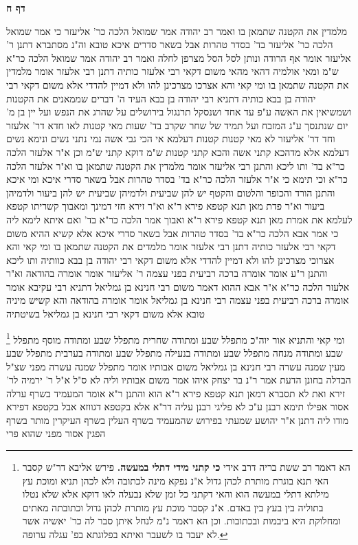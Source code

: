 \documentclass[12pt, openany]{book}
\newcommand{\sethebfont}{
\fontsize{10.5pt}{21.0pt} \selectfont
}
\newcommand{\twocol}[1]{
	{\sethebfont \begin{multicols}{2}
			#1
	\end{multicols}}	
}
\newcommand{\sectname}{}
\newcommand{\newsection}[1]{
	\addcontentsline{toc}{section}{#1}
	\renewcommand{\sectname}{#1}	
	\vspace{-\baselineskip}
	\begin{center}
		\textbf{%
\fontsize{16pt}{16pt}\selectfont
			#1}
	\end{center}
	\vspace{-\baselineskip}
	\nopagebreak
}
\newcommand{\footnotecomment}[1]{
	\renewcommand\thefootnote{}
	\footnote{#1}}
\newcommand{\commenta}[1]{\footnotecomment{#1}}
\begin{document}
\newsection{דף ח}
\twocol{מלמדין את הקטנה שתמאן בו ואמר רב יהודה אמר שמואל הלכה כר' אליעזר כי אמר שמואל הלכה כר' אליעזר בד' בסדר טהרות אבל בשאר סדרים איכא טובא 
וה"נ מסתברא דתנן ר' אליעזר אומר אף הרודה ונותן לסל הסל מצרפן לחלה ואמר רב יהודה אמר שמואל הלכה כר"א ש"מ 
ומאי אולמיה דהאי מהאי משום דקאי רבי אלעזר כותיה 
דתנן רבי אלעזר אומר מלמדין את הקטנה שתמאן בו 
ומי קאי והא אצרכו מצרכינן להו ולא דמיין להדדי אלא משום דקאי רבי יהודה בן בבא כותיה 
דתניא רבי יהודה בן בבא העיד ה' דברים שממאנים את הקטנות
ושמשיאין את האשה ע"פ עד אחד ושנסקל תרנגול בירושלים על שהרג את הנפש ועל יין בן מ' יום שנתנסך ע"ג המזבח ועל תמיד של שחר שקרב בד' שעות 
מאי קטנות לאו חדא דר' אלעזר וחד דר' אליעזר לא מאי קטנות קטנות דעלמא 
אי הכי גבי אשה נמי נתני נשים ונימא נשים דעלמא אלא מדהכא קתני אשה והכא קתני קטנות ש"מ דוקא קתני ש"מ 
וכן א"ר אלעזר הלכה כר"א בד' ותו ליכא והתנן רבי אליעזר אומר מלמדין את הקטנה שתמאן בו וא"ר אלעזר הלכה כר"א וכי תימא כי א"ר אלעזר הלכה כר"א בד' בסדר טהרות אבל בשאר סדרי איכא ומי איכא 
והתנן הורד והכופר והלטום והקטף יש להן שביעית ולדמיהן שביעית יש להן ביעור ולדמיהן ביעור וא"ר פדת מאן תנא קטפא פירא ר"א 
וא"ר זירא חזי דמינך ומאבוך קשריתו קטפא לעלמא את אמרת מאן תנא קטפא פירא ר"א ואבוך אמר הלכה כר"א בד' 
ואם איתא לימא ליה כי אמר אבא הלכה כר"א בד' בסדר טהרות אבל בשאר סדרי איכא 
אלא קשיא ההיא משום דקאי רבי אלעזר כותיה דתנן רבי אלעזר אומר מלמדים את הקטנה שתמאן בו 
ומי קאי והא אצרוכי מצרכינן להו ולא דמיין להדדי אלא משום דקאי רבי יהודה בן בבא כוותיה 
ותו ליכא והתנן ר"ע אומר אומרה ברכה רביעית בפני עצמה ר' אליעזר אומר אומרה בהודאה וא"ר אלעזר הלכה כר"א 
א"ר אבא ההוא דאמר משום רבי חנינא בן גמליאל דתניא רבי עקיבא אומר אומרה ברכה רביעית בפני עצמה רבי חנינא בן גמליאל אומר אומרה בהודאה
והא קשיש מיניה טובא אלא משום דקאי רבי חנינא בן גמליאל בשיטתיה 
\commenta{ הא דאמר רב ששת בריה דרב אידי \textbf{כי קתני מידי דתלי במעשה.} פירש אליבא דר"ש קסבר האי תנא בוגרת מותרת לכהן גדול א"נ נפקא מינה לכתובה ולא לכהן תניא ומוכת עץ מילתא דתלי במעשה הוא והאי דקתני כל זמן שלא נבעלה לאו דוקא אלא שלא נטלו בתוליה בין בעץ בין באדם. א"נ קסבר מוכת עץ מותרת לכהן גדול וכתובתה מאתים ומחלוקת היא ביבמות ובכתובות. וכן הא דאמר נ"מ לנחל איתן סבר לה כר' יאשיה אשר לא יעבד בו לשעבר ואיתא בפלוגתא בפ' עגלה ערופה. }
ומי קאי והתניא אור יוה"כ מתפלל שבע ומתודה שחרית מתפלל שבע ומתודה מוסף מתפלל שבע ומתודה מנחה מתפלל שבע ומתודה בנעילה מתפלל שבע ומתודה בערבית מתפלל שבע מעין שמנה עשרה 
רבי חנינא בן גמליאל משום אבותיו אומר מתפלל שמנה עשרה מפני שצ"ל הבדלה בחונן הדעת אמר ר"נ בר יצחק איהו אמר משום אבותיו וליה לא ס"ל 
א"ל ר' ירמיה לר' זירא ואת לא תסברא דמאן תנא קטפא פירא ר"א הוא והתנן ר"א אומר המעמיד בשרף ערלה אסור 
אפילו תימא רבנן ע"כ לא פליגי רבנן עליה דר"א אלא בקטפא דגווזא אבל בקטפא דפירא מודו ליה דתנן א"ר יהושע שמעתי בפירוש שהמעמיד בשרף העלין בשרף העיקרין מותר בשרף הפגין אסור מפני שהוא פרי 
}
\end{document}
